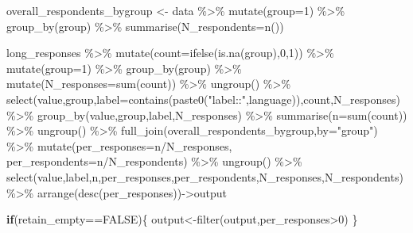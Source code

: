 \documentclass[
  letterpaper,
  DIV=11,
  numbers=noendperiod]{scrreprt}
\newenvironment{Shaded}{\begin{snugshade}}{\end{snugshade}}
\newcommand{\AttributeTok}[1]{\textcolor[rgb]{0.40,0.45,0.13}{#1}}
\newcommand{\ConstantTok}[1]{\textcolor[rgb]{0.56,0.35,0.01}{#1}}
\newcommand{\ControlFlowTok}[1]{\textcolor[rgb]{0.00,0.23,0.31}{\textbf{#1}}}
\newcommand{\DecValTok}[1]{\textcolor[rgb]{0.68,0.00,0.00}{#1}}
\newcommand{\FunctionTok}[1]{\textcolor[rgb]{0.28,0.35,0.67}{#1}}
\newcommand{\NormalTok}[1]{\textcolor[rgb]{0.00,0.23,0.31}{#1}}
\newcommand{\OtherTok}[1]{\textcolor[rgb]{0.00,0.23,0.31}{#1}}
\newcommand{\SpecialCharTok}[1]{\textcolor[rgb]{0.37,0.37,0.37}{#1}}
\newcommand{\StringTok}[1]{\textcolor[rgb]{0.13,0.47,0.30}{#1}}
\begin{document}
\begin{Shaded}
\begin{Highlighting}[]
  
\NormalTok{  overall\_respondents\_bygroup }\OtherTok{\textless{}{-}}\NormalTok{ data  }\SpecialCharTok{\%\textgreater{}\%} 
    \FunctionTok{mutate}\NormalTok{(}\AttributeTok{group=}\DecValTok{1}\NormalTok{) }\SpecialCharTok{\%\textgreater{}\%}
    \FunctionTok{group\_by}\NormalTok{(group) }\SpecialCharTok{\%\textgreater{}\%}
    \FunctionTok{summarise}\NormalTok{(}\AttributeTok{N\_respondents=}\FunctionTok{n}\NormalTok{()) }
  
\NormalTok{  long\_responses }\SpecialCharTok{\%\textgreater{}\%}
    \FunctionTok{mutate}\NormalTok{(}\AttributeTok{count=}\FunctionTok{ifelse}\NormalTok{(}\FunctionTok{is.na}\NormalTok{(group),}\DecValTok{0}\NormalTok{,}\DecValTok{1}\NormalTok{)) }\SpecialCharTok{\%\textgreater{}\%}
    \FunctionTok{mutate}\NormalTok{(}\AttributeTok{group=}\DecValTok{1}\NormalTok{) }\SpecialCharTok{\%\textgreater{}\%}
    \FunctionTok{group\_by}\NormalTok{(group) }\SpecialCharTok{\%\textgreater{}\%}
    \FunctionTok{mutate}\NormalTok{(}\AttributeTok{N\_responses=}\FunctionTok{sum}\NormalTok{(count)) }\SpecialCharTok{\%\textgreater{}\%}
    \FunctionTok{ungroup}\NormalTok{() }\SpecialCharTok{\%\textgreater{}\%}
    \FunctionTok{select}\NormalTok{(value,group,}\AttributeTok{label=}\FunctionTok{contains}\NormalTok{(}\FunctionTok{paste0}\NormalTok{(}\StringTok{"label::"}\NormalTok{,language)),count,N\_responses) }\SpecialCharTok{\%\textgreater{}\%}
    \FunctionTok{group\_by}\NormalTok{(value,group,label,N\_responses) }\SpecialCharTok{\%\textgreater{}\%}
    \FunctionTok{summarise}\NormalTok{(}\AttributeTok{n=}\FunctionTok{sum}\NormalTok{(count)) }\SpecialCharTok{\%\textgreater{}\%}
    \FunctionTok{ungroup}\NormalTok{() }\SpecialCharTok{\%\textgreater{}\%}
    \FunctionTok{full\_join}\NormalTok{(overall\_respondents\_bygroup,}\AttributeTok{by=}\StringTok{"group"}\NormalTok{) }\SpecialCharTok{\%\textgreater{}\%}
    \FunctionTok{mutate}\NormalTok{(}\AttributeTok{per\_responses=}\NormalTok{n}\SpecialCharTok{/}\NormalTok{N\_responses,}
           \AttributeTok{per\_respondents=}\NormalTok{n}\SpecialCharTok{/}\NormalTok{N\_respondents) }\SpecialCharTok{\%\textgreater{}\%}
    \FunctionTok{ungroup}\NormalTok{() }\SpecialCharTok{\%\textgreater{}\%}
    \FunctionTok{select}\NormalTok{(value,label,n,per\_responses,per\_respondents,N\_responses,N\_respondents) }\SpecialCharTok{\%\textgreater{}\%}
    \FunctionTok{arrange}\NormalTok{(}\FunctionTok{desc}\NormalTok{(per\_responses))}\OtherTok{{-}\textgreater{}}\NormalTok{output}
  
  \ControlFlowTok{if}\NormalTok{(retain\_empty}\SpecialCharTok{==}\ConstantTok{FALSE}\NormalTok{)\{}
\NormalTok{    output}\OtherTok{\textless{}{-}}\FunctionTok{filter}\NormalTok{(output,per\_responses}\SpecialCharTok{\textgreater{}}\DecValTok{0}\NormalTok{)}
\NormalTok{  \}}
  

\end{Highlighting}
\end{Shaded}
\end{document}
